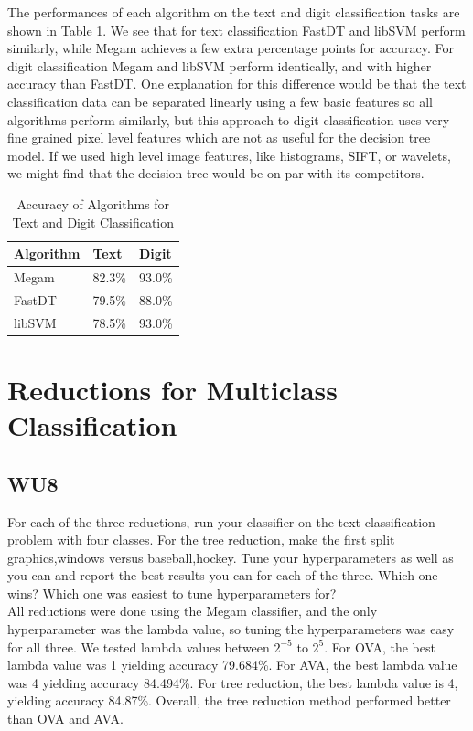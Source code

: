 \documentclass[a4paper,11pt]{article}
\begin{document}
The performances of each algorithm on the text and digit classification 
tasks are shown in Table \ref{tables:WU7}. We see that for text 
classification FastDT and libSVM perform similarly, while Megam achieves a 
few extra percentage points for accuracy. For digit classification Megam and 
libSVM perform identically, and with higher accuracy than FastDT. One 
explanation for this difference would be that the text classification data 
can be separated linearly using a few basic features so all algorithms 
perform similarly, but this approach to digit classification uses very fine 
grained pixel level features which are not as useful for the decision tree 
model. If we used high level image features, like histograms, SIFT, or 
wavelets, we might find that the decision tree would be on par with
its competitors.

\begin{table}[!ht]
\begin{center}
    \begin{tabular}{ | l | l | l |} \hline
    Algorithm & Text   & Digit \\ \hline
    Megam     & 82.3\% & 93.0\% \\ \hline
    FastDT    & 79.5\% & 88.0\% \\ \hline
    libSVM    & 78.5\% & 93.0\% \\ \hline
    \end{tabular}
    \caption{Accuracy of Algorithms for Text and Digit Classification}
    \label{tables:WU7}
\end{center}
\end{table}

\pagebreak
\section{Reductions for Multiclass Classification}
\subsection{WU8}
\textsf{For each of the three reductions, run your classifier on the
text classification problem with four classes. For the tree reduction, 
make the first split {graphics,windows} versus {baseball,hockey}. 
Tune your hyperparameters as well as you can and report the best 
results you can for each of the three. Which one wins? Which one was 
easiest to tune hyperparameters for?}\\

All reductions were done using the Megam classifier, 
and the only hyperparameter was the lambda value,
so tuning the hyperparameters was easy for all three.
We tested lambda values between $2^{-5}$ to $2^{5}$.
For OVA, the best lambda value was 1 yielding accuracy 79.684\%. 
For AVA, the best lambda value was 4 yielding accuracy 84.494\%. 
For tree reduction, the best lambda value is 4, yielding accuracy 84.87\%.
Overall, the tree reduction method performed better than OVA and AVA.
\end{document}
